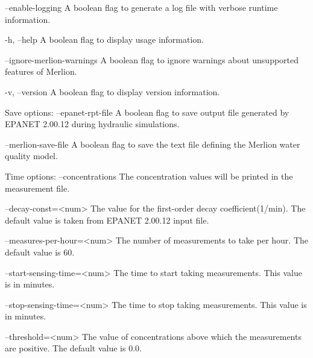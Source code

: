 \begin{unknownListing}
     --enable-logging        
     A boolean flag to generate a log file with verbose runtime information.
	 
     -h, --help                  
     A boolean flag to display usage information.
	 
     --ignore-merlion-warnings
     A boolean flag to ignore warnings about unsupported features of Merlion.
     
     -v, --version               
     A boolean flag to display version information.
 
Save options:
     --epanet-rpt-file       
     A boolean flag to save output file generated by EPANET 2.00.12 during hydraulic simulations.
     
     --merlion-save-file     
     A boolean flag to save the text file defining the Merlion water quality model.
 
Time options:
     --concentrations        
     The concentration values will be printed in the measurement file.
     
     --decay-const=<num>           
     The value for the first-order decay coefficient(1/min). The default value is taken from EPANET 2.00.12  
     input file.
     
     --measures-per-hour=<num>     
     The number of measurements to take per hour. The default value is 60.
     
     --start-sensing-time=<num>    
     The time to start taking measurements. This value is in minutes.
     
     --stop-sensing-time=<num>     
     The time to stop taking measurements. This value is in minutes.
     
     --threshold=<num>             
     The value of concentrations above which the measurements are positive. The default value is 0.0.
 

\end{unknownListing}

